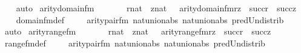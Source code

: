 \begin{isabellebody}
\ \ \isamarkupfalse%
\ auto%
\endisatagproof
{\isafoldproof}%
%
\isadelimproof
\isanewline
%
\endisadelimproof
\isanewline
{}\isamarkupfalse%
\ arity{\isacharunderscore}{\kern0pt}domain{\isacharunderscore}{\kern0pt}fm\ {\isacharcolon}{\kern0pt}\ \isanewline
\ \ \ \ {\isachardoublequoteopen}{\isasymlbrakk}\ r{\isasymin}nat\ {\isacharsemicolon}{\kern0pt}\ z{\isasymin}nat\ {\isasymrbrakk}\ {\isasymLongrightarrow}\ arity{\isacharparenleft}{\kern0pt}domain{\isacharunderscore}{\kern0pt}fm{\isacharparenleft}{\kern0pt}r{\isacharcomma}{\kern0pt}z{\isacharparenright}{\kern0pt}{\isacharparenright}{\kern0pt}\ {\isacharequal}{\kern0pt}\ succ{\isacharparenleft}{\kern0pt}r{\isacharparenright}{\kern0pt}\ {\isasymunion}\ succ{\isacharparenleft}{\kern0pt}z{\isacharparenright}{\kern0pt}{\isachardoublequoteclose}\isanewline
%
\isadelimproof
\ \ %
\endisadelimproof
%
\isatagproof
{}\isamarkupfalse%
\ domain{\isacharunderscore}{\kern0pt}fm{\isacharunderscore}{\kern0pt}def\ \isanewline
\ \ \isamarkupfalse%
\ arity{\isacharunderscore}{\kern0pt}pair{\isacharunderscore}{\kern0pt}fm\ nat{\isacharunderscore}{\kern0pt}union{\isacharunderscore}{\kern0pt}abs{}\ nat{\isacharunderscore}{\kern0pt}union{\isacharunderscore}{\kern0pt}abs{}\ pred{\isacharunderscore}{\kern0pt}Un{\isacharunderscore}{\kern0pt}distrib\isanewline
\ \ \isamarkupfalse%
\ auto%
\endisatagproof
{\isafoldproof}%
%
\isadelimproof
\isanewline
%
\endisadelimproof
\isanewline
{}\isamarkupfalse%
\ arity{\isacharunderscore}{\kern0pt}range{\isacharunderscore}{\kern0pt}fm\ {\isacharcolon}{\kern0pt}\ \isanewline
\ \ \ \ {\isachardoublequoteopen}{\isasymlbrakk}\ r{\isasymin}nat\ {\isacharsemicolon}{\kern0pt}\ z{\isasymin}nat\ {\isasymrbrakk}\ {\isasymLongrightarrow}\ arity{\isacharparenleft}{\kern0pt}range{\isacharunderscore}{\kern0pt}fm{\isacharparenleft}{\kern0pt}r{\isacharcomma}{\kern0pt}z{\isacharparenright}{\kern0pt}{\isacharparenright}{\kern0pt}\ {\isacharequal}{\kern0pt}\ succ{\isacharparenleft}{\kern0pt}r{\isacharparenright}{\kern0pt}\ {\isasymunion}\ succ{\isacharparenleft}{\kern0pt}z{\isacharparenright}{\kern0pt}{\isachardoublequoteclose}\isanewline
%
\isadelimproof
\ \ %
\endisadelimproof
%
\isatagproof
{}\isamarkupfalse%
\ range{\isacharunderscore}{\kern0pt}fm{\isacharunderscore}{\kern0pt}def\ \isanewline
\ \ \isamarkupfalse%
\ arity{\isacharunderscore}{\kern0pt}pair{\isacharunderscore}{\kern0pt}fm\ nat{\isacharunderscore}{\kern0pt}union{\isacharunderscore}{\kern0pt}abs{}\ nat{\isacharunderscore}{\kern0pt}union{\isacharunderscore}{\kern0pt}abs{}\ pred{\isacharunderscore}{\kern0pt}Un{\isacharunderscore}{\kern0pt}distrib\isanewline

\end{isabellebody}
